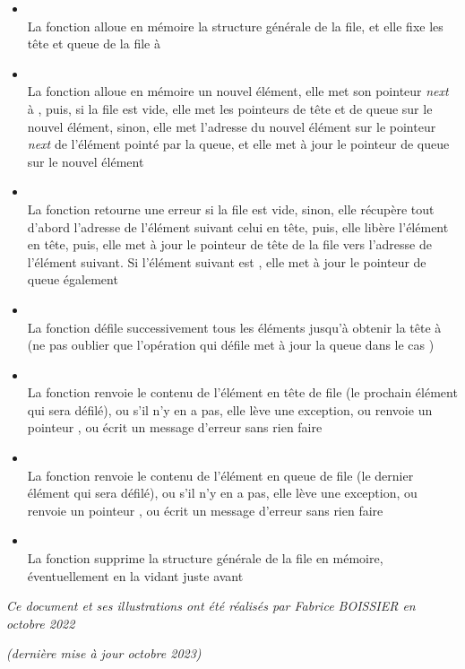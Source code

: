 \documentclass[11pt,a4paper]{article}
\begin{document}
\begin{itemize}
\item {}\\
      La fonction alloue en mémoire la structure générale de la file, et elle fixe les tête et queue de la file à 
\item {}\\
      La fonction alloue en mémoire un nouvel élément, elle met son pointeur \textit{next} à , puis, si la file est vide, elle met les pointeurs de tête et de queue sur le nouvel élément, sinon, elle met l'adresse du nouvel élément sur le pointeur \textit{next} de l'élément pointé par la queue, et elle met à jour le pointeur de queue sur le nouvel élément
\item {}\\
      La fonction retourne une erreur si la file est vide, sinon, elle récupère tout d'abord l'adresse de l'élément suivant celui en tête, puis, elle libère l'élément en tête, puis, elle met à jour le pointeur de tête de la file vers l'adresse de l'élément suivant. Si l'élément suivant est , elle met à jour le pointeur de queue également
\item {}\\
      La fonction défile successivement tous les éléments jusqu'à obtenir la tête à  (ne pas oublier que l'opération qui défile met à jour la queue dans le cas )
\item {}\\
      La fonction renvoie le contenu de l'élément en tête de file (le prochain élément qui sera défilé), ou s'il n'y en a pas, elle lève une exception, ou renvoie un pointeur , ou écrit un message d'erreur sans rien faire
\item {}\\
      La fonction renvoie le contenu de l'élément en queue de file (le dernier élément qui sera défilé), ou s'il n'y en a pas, elle lève une exception, ou renvoie un pointeur , ou écrit un message d'erreur sans rien faire
\item {}\\
      La fonction supprime la structure générale de la file en mémoire, éventuellement en la vidant juste avant
\end{itemize}


\bigskip

\vfillFirst

\vfillLast

\begin{center}
\textit{Ce document et ses illustrations ont été réalisés par Fabrice BOISSIER en octobre 2022}

\textit{(dernière mise à jour octobre 2023)}
\end{center}
\end{document}
